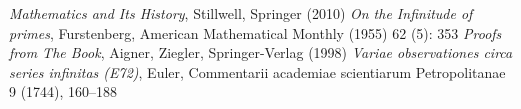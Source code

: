 \documentclass[a4paper]{article}
\theoremstyle{definition}
\theoremstyle{remark}
\begin{document}
\begin{thebibliography}{12}
    \textit{Mathematics and Its History}, Stillwell, Springer (2010)
    \textit{On the Infinitude of primes}, Furstenberg, American Mathematical Monthly (1955) 62 (5): 353
    \textit{Proofs from The Book}, Aigner, Ziegler, Springer-Verlag (1998)
    \textit{Variae observationes circa series infinitas (E72)}, Euler, Commentarii academiae scientiarum
    Petropolitanae 9 (1744), 160–188
\end{thebibliography}
\end{document}
